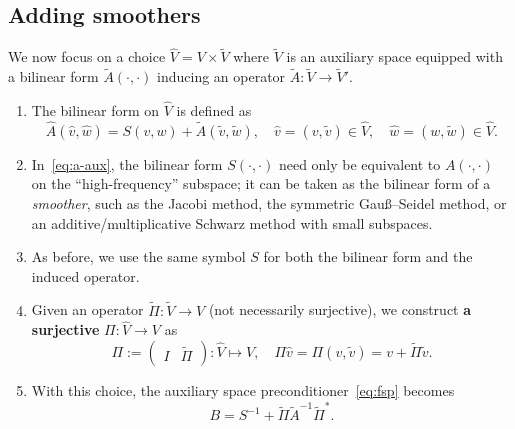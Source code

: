\documentclass[11pt]{article}
\theoremstyle{remark}
\begin{document}
\subsection{Adding smoothers}
  We now focus on a choice \(\widehat{V} = V \times \widetilde{V}\) where $\widetilde{V}$ is an auxiliary space equipped with a bilinear form $\widetilde{A}(\cdot,\cdot)$ inducing an operator $\widetilde{A} : \widetilde{V} \to \widetilde{V}'$.
\begin{enumerate}[{\bf {\thesubsection}.1.}]
\item The bilinear form on $\widehat{V}$ is defined as
\begin{equation}\label{eq:a-aux}
  \widehat{A}(\widehat{v},\widehat{w}) = S(v,w) + \widetilde{A}(\widetilde{v},\widetilde{w}), \quad 
  \widehat{v} = (v,\widetilde{v}) \in \widehat{V}, \quad \widehat{w} = (w,\widetilde{w}) \in \widehat{V}.
\end{equation}
\item In~\eqref{eq:a-aux}, the bilinear form $S(\cdot,\cdot)$ need only be equivalent to $A(\cdot,\cdot)$ on the ``high-frequency'' subspace; it can be taken as the bilinear form of a \emph{smoother}, such as the Jacobi method, the symmetric Gau\ss--Seidel method, or an additive/multiplicative Schwarz method with small subspaces.
\item As before, we use the same symbol $S$ for both the bilinear form and the induced operator.

\item Given an operator $\widetilde{\Pi} : \widetilde{V} \to V$ (not necessarily surjective), we construct {\bf a surjective} $\Pi:\widehat{V} \to V$ as
\begin{equation}
  \label{eq:Pi-def}
  \Pi := \begin{pmatrix}
    I & \widetilde{\Pi} 
  \end{pmatrix} : \widehat{V} \mapsto V, 
  \quad\Pi\widehat{v}=\Pi(v,\widetilde{v}) = v + \widetilde{\Pi}\widetilde{v}.
\end{equation}
\item With this choice, the auxiliary space preconditioner~\eqref{eq:fsp} becomes
\begin{equation}
  \label{eq:B-aux}
  B = S^{-1} + \widetilde{\Pi}\widetilde{A}^{-1}\widetilde{\Pi}^*.
\end{equation}
\end{enumerate}
\end{document}
